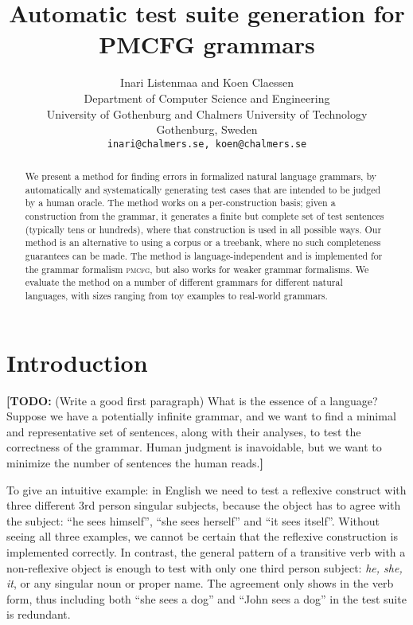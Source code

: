\documentclass[11pt]{article}
\def\pmcfg{\textsc{pmcfg}}
\newcommand{\todo}[1]{{\color{cyan}\textbf{[TODO: }#1\textbf{]}}}
\begin{document}
%
\title{Automatic test suite generation for PMCFG grammars}
%
\author{Inari Listenmaa and Koen Claessen \\
  Department of Computer Science and Engineering \\
  University of Gothenburg and Chalmers University of Technology \\
  Gothenburg, Sweden \\
  {\tt inari@chalmers.se, koen@chalmers.se} }

\maketitle              %
%
\begin{abstract}
We present a method for finding errors in formalized natural language grammars, by automatically and systematically generating test cases that are intended to be judged by a human oracle. The method works on a per-construction basis; given a construction from the grammar, it generates a finite but complete set of test sentences (typically tens or hundreds), where that construction is used in all possible ways. Our method is an alternative to using a corpus or a treebank, where no such completeness guarantees can be made. The method is language-independent and is implemented for the grammar formalism \pmcfg{}, but also works for weaker grammar formalisms. We evaluate the method on a number of different grammars for different natural languages, with sizes ranging from toy examples to real-world grammars.
\end{abstract}
%
%
%
\section{Introduction}

\todo{(Write a good first paragraph)
What is the essence of a language? 
Suppose we have a potentially infinite grammar, and we want to find a
minimal and representative set of sentences, along with their
analyses, to test the correctness of the grammar. Human judgment is
inavoidable, but we want to minimize the number of sentences the human
reads.}

To give an intuitive example: in English we need to test a reflexive
construct with three different 3rd person singular subjects, because
the object has to agree with the subject: ``he sees himself'', ``she
sees herself'' and ``it sees itself''. Without seeing all three
examples, we cannot be certain that the reflexive construction is
implemented correctly. In contrast, the general pattern of a transitive
verb with a non-reflexive object is enough to test with only one third
person subject: \emph{he, she, it}, or any singular noun or proper
name. The agreement only shows in the verb form, thus including both
``she sees a dog'' and ``John sees a dog'' in the test suite is redundant. 
\end{document}
